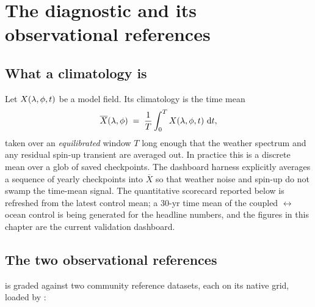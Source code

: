 \section{The diagnostic and its observational references}\label{sec:c16_framework}

\subsection{What a climatology is}

Let $X(\lambda,\phi,t)$ be a model field. Its climatology is the time mean
%
\begin{equation}
  \overline{X}(\lambda,\phi) \;=\; \frac{1}{T}\int_{0}^{T} X(\lambda,\phi,t)\,\,\mathrm{d} t ,
  \label{eq:c16_climmean}
\end{equation}
%
taken over an \emph{equilibrated} window $T$ long enough that the weather
spectrum and any residual spin-up transient are averaged out. In practice this
is a discrete mean over a glob of saved checkpoints. The dashboard harness
 explicitly averages a sequence of yearly
checkpoints into $\overline{X}$ so that weather noise and spin-up do not swamp
the time-mean signal. The quantitative scorecard reported below is refreshed
from the latest control mean; a 30-yr time mean of the coupled
\dino{}$\leftrightarrow$ocean control is being generated for the headline
numbers, and the figures in this chapter are the current validation dashboard.

\subsection{The two observational references}

\model{} is graded against two community reference datasets, each on its native
grid, loaded by :

